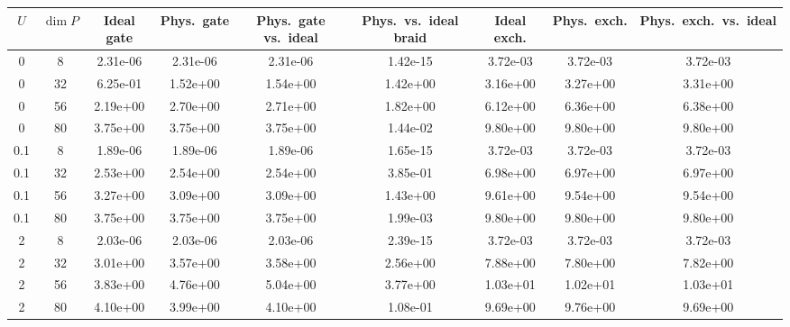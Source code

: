 \begin{tabular}{ccccccccc}
\hline
$U$ & $\dim P$ & Ideal gate & Phys.\ gate & Phys.\ gate vs.\ ideal & Phys.\ vs.\ ideal braid & Ideal exch. & Phys.\ exch. & Phys.\ exch.\ vs.\ ideal \\
\hline
0 & 8 & 2.31e-06 & 2.31e-06 & 2.31e-06 & 1.42e-15 & 3.72e-03 & 3.72e-03 & 3.72e-03 \\
0 & 32 & 6.25e-01 & 1.52e+00 & 1.54e+00 & 1.42e+00 & 3.16e+00 & 3.27e+00 & 3.31e+00 \\
0 & 56 & 2.19e+00 & 2.70e+00 & 2.71e+00 & 1.82e+00 & 6.12e+00 & 6.36e+00 & 6.38e+00 \\
0 & 80 & 3.75e+00 & 3.75e+00 & 3.75e+00 & 1.44e-02 & 9.80e+00 & 9.80e+00 & 9.80e+00 \\
\hline
0.1 & 8 & 1.89e-06 & 1.89e-06 & 1.89e-06 & 1.65e-15 & 3.72e-03 & 3.72e-03 & 3.72e-03 \\
0.1 & 32 & 2.53e+00 & 2.54e+00 & 2.54e+00 & 3.85e-01 & 6.98e+00 & 6.97e+00 & 6.97e+00 \\
0.1 & 56 & 3.27e+00 & 3.09e+00 & 3.09e+00 & 1.43e+00 & 9.61e+00 & 9.54e+00 & 9.54e+00 \\
0.1 & 80 & 3.75e+00 & 3.75e+00 & 3.75e+00 & 1.99e-03 & 9.80e+00 & 9.80e+00 & 9.80e+00 \\
\hline
2 & 8 & 2.03e-06 & 2.03e-06 & 2.03e-06 & 2.39e-15 & 3.72e-03 & 3.72e-03 & 3.72e-03 \\
2 & 32 & 3.01e+00 & 3.57e+00 & 3.58e+00 & 2.56e+00 & 7.88e+00 & 7.80e+00 & 7.82e+00 \\
2 & 56 & 3.83e+00 & 4.76e+00 & 5.04e+00 & 3.77e+00 & 1.03e+01 & 1.02e+01 & 1.03e+01 \\
2 & 80 & 4.10e+00 & 3.99e+00 & 4.10e+00 & 1.08e-01 & 9.69e+00 & 9.76e+00 & 9.69e+00 \\
\hline
\end{tabular}
